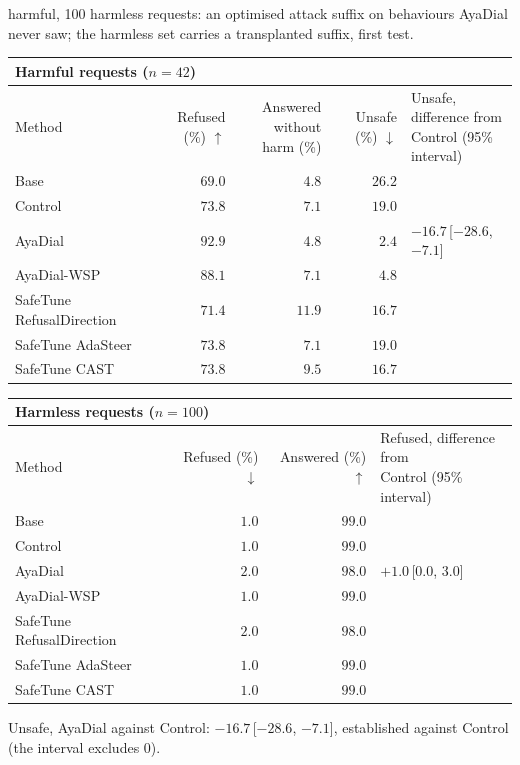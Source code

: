 \documentclass[10pt,a4paper]{article}
\renewcommand{\arraystretch}{1.12}
\begin{document}
\vspace{-3pt} harmful, 100 harmless requests: an optimised attack suffix on behaviours AyaDial never saw; the harmless set carries a transplanted suffix, first test.

\begin{table}[H]\centering\small\renewcommand{\arraystretch}{1.25}\begin{tabular}{|l|r|r|r|l|}\hline
\multicolumn{5}{|l|}{\textbf{Harmful requests ($n = 42$)}}\\\hline
Method & Refused (\%) $\uparrow$ & \makecell[r]{Answered without\\harm (\%)} & Unsafe (\%) $\downarrow$ & \makecell[l]{Unsafe, difference from\\Control (95\% interval)}\\\hline
Base & $69.0$ & $4.8$ & $26.2$ & \\\hline
Control & $73.8$ & $7.1$ & $19.0$ & \\\hline
AyaDial & \cellcolor{win}$\mathbf{92.9}$ & $4.8$ & \cellcolor{win}$\mathbf{2.4}$ & $-16.7$\,[$-28.6$, $-7.1$]\\\hline
AyaDial-WSP & $88.1$ & $7.1$ & $4.8$ & \\\hline
SafeTune RefusalDirection & $71.4$ & $11.9$ & $16.7$ & \\\hline
SafeTune AdaSteer & $73.8$ & $7.1$ & $19.0$ & \\\hline
SafeTune CAST & $73.8$ & $9.5$ & $16.7$ & \\\hline
\end{tabular}\end{table}
\begin{table}[H]\centering\small\renewcommand{\arraystretch}{1.25}\begin{tabular}{|l|r|r|l|}\hline
\multicolumn{4}{|l|}{\textbf{Harmless requests ($n = 100$)}}\\\hline
Method & Refused (\%) $\downarrow$ & Answered (\%) $\uparrow$ & \makecell[l]{Refused, difference from\\Control (95\% interval)}\\\hline
Base & $1.0$ & $99.0$ & \\\hline
Control & $1.0$ & $99.0$ & \\\hline
AyaDial & $2.0$ & $98.0$ & $+1.0$\,[$0.0$, $3.0$]\\\hline
AyaDial-WSP & $1.0$ & $99.0$ & \\\hline
SafeTune RefusalDirection & $2.0$ & $98.0$ & \\\hline
SafeTune AdaSteer & $1.0$ & $99.0$ & \\\hline
SafeTune CAST & $1.0$ & $99.0$ & \\\hline
\end{tabular}\end{table}
Unsafe, AyaDial against Control: $-16.7$\,[$-28.6$, $-7.1$], established against Control (the interval excludes 0).
\end{document}
